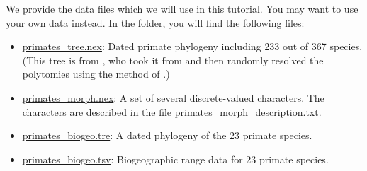 We provide the data files which we will use in this tutorial.
You may want to use your own data instead.
In the  folder, you will find the following files:
\begin{itemize}

    \item \href{https://github.com/revbayes/revbayes_tutorial/raw/master/RB_DiversificationRate_CharacterDependent_Tutorial/data/primates_tree.nex}{primates\_tree.nex}:
        Dated primate phylogeny including 233 out of 367 species.
        (This tree is from \citealt{MagnusonFord2012}, who took it from \citealt{Vos2006} and then randomly resolved the polytomies using the method of \citealt{Kuhn2011}.)


    \item \href{https://github.com/revbayes/revbayes_tutorial/raw/master/RB_DiversificationRate_CharacterDependent_Tutorial/data/primates_morph.nex}{primates\_morph.nex}:
        A set of several discrete-valued characters. %
        The characters are described in the file \href{https://github.com/revbayes/revbayes_tutorial/raw/master/RB_DiversificationRate_CharacterDependent_Tutorial/data/primates_morph_description.txt}{primates\_morph\_description.txt}.

    \item \href{https://github.com/revbayes/revbayes_tutorial/raw/master/RB_DiversificationRate_CharacterDependent_Tutorial/data/primates_biogeo.tre}{primates\_biogeo.tre}: 
        A dated phylogeny of the 23 primate species. %
    
    \item \href{https://github.com/revbayes/revbayes_tutorial/raw/master/RB_DiversificationRate_CharacterDependent_Tutorial/data/primates_biogeo.tsv}{primates\_biogeo.tsv}:
        Biogeographic range data for 23 primate species.

\end{itemize}



\newpage

